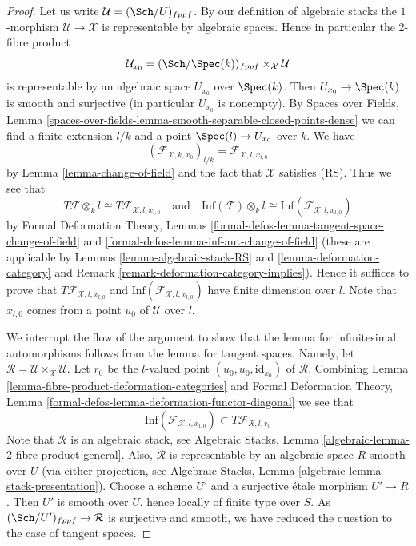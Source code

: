 \begin{proof}
Let us write $\mathcal{U} = (\Sch/U)_{fppf}$. By our definition
of algebraic stacks the $1$-morphism $\mathcal{U} \to \mathcal{X}$
is representable by algebraic spaces. Hence in particular the
2-fibre product
$$
\mathcal{U}_{x_0} = (\Sch/\Spec(k))_{fppf} \times_\mathcal{X} \mathcal{U}
$$
is representable by an algebraic space $U_{x_0}$ over $\Spec(k)$. Then
$U_{x_0} \to \Spec(k)$ is smooth and surjective (in particular $U_{x_0}$
is nonempty). By Spaces over Fields, Lemma
\ref{spaces-over-fields-lemma-smooth-separable-closed-points-dense}
we can find a finite extension $l/k$ and a point
$\Spec(l) \to U_{x_0}$ over $k$. We have
$$
(\mathcal{F}_{\mathcal{X}, k , x_0})_{l/k} =
\mathcal{F}_{\mathcal{X}, l, x_{l, 0}}
$$
by Lemma \ref{lemma-change-of-field} and the fact that $\mathcal{X}$
satisfies (RS). Thus we see that
$$
T\mathcal{F} \otimes_k l \cong T\mathcal{F}_{\mathcal{X}, l, x_{l, 0}}
\quad\text{and}\quad
\text{Inf}(\mathcal{F}) \otimes_k l \cong
\text{Inf}(\mathcal{F}_{\mathcal{X}, l, x_{l, 0}})
$$
by
Formal Deformation Theory, Lemmas
\ref{formal-defos-lemma-tangent-space-change-of-field} and
\ref{formal-defos-lemma-inf-aut-change-of-field}
(these are applicable by
Lemmas \ref{lemma-algebraic-stack-RS} and
\ref{lemma-deformation-category} and
Remark \ref{remark-deformation-category-implies}).
Hence it suffices to prove that $T\mathcal{F}_{\mathcal{X}, l, x_{l, 0}}$
and $\text{Inf}(\mathcal{F}_{\mathcal{X}, l, x_{l, 0}})$
have finite dimension over $l$. Note that $x_{l, 0}$ comes from a point
$u_0$ of $\mathcal{U}$ over $l$.

\medskip\noindent
We interrupt the flow of the argument to show that the lemma for
infinitesimal automorphisms follows from the lemma for tangent spaces.
Namely, let
$\mathcal{R} = \mathcal{U} \times_\mathcal{X} \mathcal{U}$.
Let $r_0$ be the $l$-valued point $(u_0, u_0, \text{id}_{x_0})$ of
$\mathcal{R}$. Combining
Lemma \ref{lemma-fibre-product-deformation-categories} and
Formal Deformation Theory, Lemma
\ref{formal-defos-lemma-deformation-functor-diagonal}
we see that
$$
\text{Inf}(\mathcal{F}_{\mathcal{X}, l, x_{l, 0}})
\subset
T\mathcal{F}_{\mathcal{R}, l, r_0}
$$
Note that $\mathcal{R}$ is an algebraic stack, see
Algebraic Stacks, Lemma \ref{algebraic-lemma-2-fibre-product-general}.
Also, $\mathcal{R}$ is representable by an algebraic space $R$
smooth over $U$ (via either projection, see
Algebraic Stacks, Lemma \ref{algebraic-lemma-stack-presentation}).
Choose a scheme $U'$ and a surjective \'etale morphism
$U' \to R$. Then $U'$ is smooth over $U$, hence locally of
finite type over $S$. As $(\Sch/U')_{fppf} \to \mathcal{R}$ is
surjective and smooth, we have reduced the question to the case
of tangent spaces.


\end{proof}
